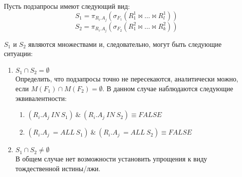\documentclass{cmi}
\def \n #1{\mathit{#1}}
\begin{document}
Пусть подзапросы имеют следующий вид:
$$S_1 = \pi_{R_i.A_j} (\sigma_{F_1} (R_1^1 \Join \dots \Join R_l^1))$$
$$S_2 = \pi_{R_i.A_j} (\sigma_{F_2} (R_1^2 \Join \dots \Join R_k^2))$$

$S_1$ и $S_2$ являются множествами и, следовательно, могут быть следующие ситуации:
\begin{enumerate}
	\item $S_1 \cap S_2 = \emptyset $\\
	Определить, что подзапросы точно не пересекаются, аналитически можно, если $M(F_1) \cap M(F_2) =
	\emptyset$. В данном случае наблюдаются следующие эквивалентности:
	\begin{enumerate}
		\item $(\n{R_i.A_j}\ \n{IN}\ S_1)\ \&\ (\n{R_i.A_j}\ \n{IN}\ S_2) \equiv \n{FALSE}$
		\item $(\n{R_i.A_j}\ = \n{ALL}\ S_1)\ \&\ (\n{R_i.A_j}\ = \n{ALL}\ S_2) \equiv \n{FALSE}$
	\end{enumerate}
	\item $S_1 \cap S_2 \neq \emptyset $\\
	В общем случае нет возможности установить упрощения к виду тождественной истины/лжи.
\end{enumerate}
\end{document}
